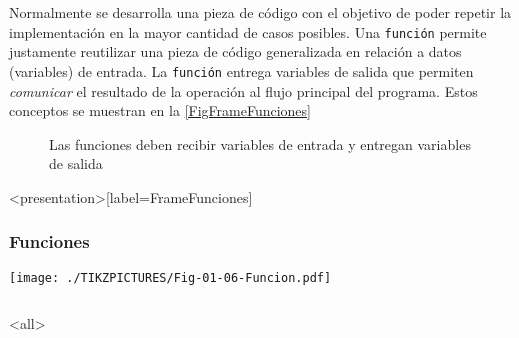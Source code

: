 
Normalmente se desarrolla una pieza de código con el objetivo
de poder repetir la implementación en la mayor cantidad de casos
posibles. Una \texttt{función} permite justamente reutilizar
una pieza de código generalizada en relación a datos (variables) de
entrada. La \texttt{función} entrega variables de salida que permiten
\emph{comunicar} el resultado de la operación al flujo principal
del programa. Estos conceptos se muestran en la \autoref{FigFrameFunciones}

\begin{figure}

  \caption{ Las funciones deben recibir variables de entrada
  y entregan variables de salida \protect\label{FigFrameFunciones} }

\end{figure}

\mode*
\begin{frame}<presentation>[label=FrameFunciones]
  \frametitle{Funciones}
    \texttt{[image: ./TIKZPICTURES/Fig-01-06-Funcion.pdf]}

    \begin{columns}
      \begin{codeblock}
	
      \end{codeblock}
      \begin{codeblock}
	
      \end{codeblock}
    \end{columns}

\end{frame}
\mode<all>
